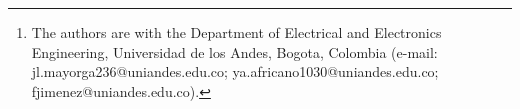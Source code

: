 \author{
Jorge Luis Mayorga Taborda, Yessica Africano Rodriguez, and Fernando Jimenez%
\thanks{The authors are with the Department of Electrical and Electronics Engineering, Universidad de los Andes, Bogota, Colombia (e-mail: jl.mayorga236@uniandes.edu.co; ya.africano1030@uniandes.edu.co; fjimenez@uniandes.edu.co).}
}
